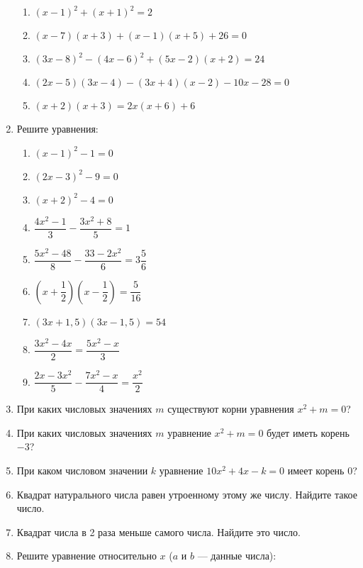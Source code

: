 \documentclass[12pt, a4paper]{article}
\begin{document}
\begin{enumerate}
\begin{enumerate}[label=\asbuk*)]
			\item $(x-1)^2+(x+1)^2=2$
			\item $(x-7)(x+3)+(x-1)(x+5)+26=0$
			\item $(3x-8)^2-(4x-6)^2+(5x-2)(x+2)=24$
			\item $(2x-5)(3x-4)-(3x+4)(x-2)-10x-28=0$
			\item $(x+2)(x+3)=2x(x+6)+6$
	\end{enumerate}
	\item Решите уравнения:
	\begin{enumerate}[label=\asbuk*)]
		\item $(x-1)^2-1=0$
		\item $(2x-3)^2-9=0$
		\item $(x+2)^2-4=0$
		\item $\dfrac{4x^2-1}{3}-\dfrac{3x^2+8}{5}=1$
		\item $\dfrac{5x^2-48}{8}-\dfrac{33-2x^2}{6}=3\dfrac{5}{6}$
		\item $\left(x+\dfrac{1}{2}\right)\left(x-\dfrac{1}{2}\right)=\dfrac{5}{16}$
		\item $(3x+1,5)(3x-1,5)=54$
		\item $\dfrac{3x^2-4x}{2}=\dfrac{5x^2-x}{3}$
		\item $\dfrac{2x-3x^2}{5}-\dfrac{7x^2-x}{4}=\dfrac{x^2}{2}$
	\end{enumerate}
	\item При каких числовых значениях $m$ существуют корни уравнения $x^2+m=0$?
	\item При каких числовых значениях $m$ уравнение $x^2+m=0$ будет иметь корень $-3$?
	\item При каком числовом значении $k$ уравнение $10x^2+4x-k=0$ имеет корень $0$?
	\item Квадрат натурального числа равен утроенному этому же числу. Найдите такое число.
	\item Квадрат числа в 2 раза меньше самого числа. Найдите это число.
	\item Решите уравнение относительно $x$ ($a$ и $b$ — данные числа):
	\begin{enumerate}[label=\asbuk*)]
	\end{enumerate}

\end{enumerate}
\end{document}
